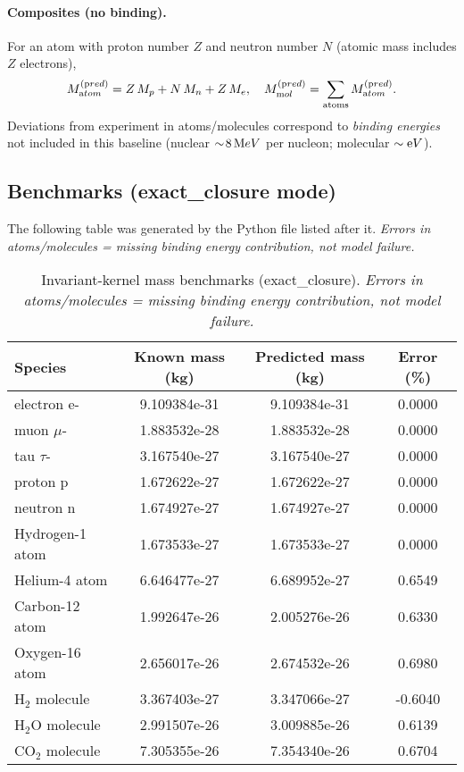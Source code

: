 \documentclass[11pt]{article}
\begin{document}
\paragraph{Composites (no binding).}
    For an atom with proton number $Z$ and neutron number $N$ (atomic mass includes $Z$ electrons),
    \[
        M_{\textrm atom}^{(\textrm pred)} = Z\,M_p+N\,M_n+Z\,M_e,\quad
        M_{\textrm mol}^{(\textrm pred)}=\sum_{\text{atoms}}M_{\textrm atom}^{(\textrm pred)}.
    \]
    Deviations from experiment in atoms/molecules correspond to \emph{binding energies} not included in this baseline (nuclear $\sim\!8\,{\textrm MeV}$ per nucleon; molecular $\sim{\textrm eV}$).

\subsection{Benchmarks (exact\_closure mode)}
\label{sec:benchmarks-exact-closure}
The following table was generated by the Python file listed after it.
\emph{Errors in atoms/molecules = missing binding energy contribution, not model failure.}

\begin{table}[H]
    \centering
    \caption{Invariant-kernel mass benchmarks (exact\_closure). \emph{Errors in atoms/molecules = missing binding energy contribution, not model failure.}}
    \begin{tabular}{lccc}
        \toprule
        Species & Known mass (kg) & Predicted mass (kg) & Error (\%)\\
        \midrule
        electron e- & 9.109384e-31 & 9.109384e-31 & 0.0000\\
        muon $\mu$- & 1.883532e-28 & 1.883532e-28 & 0.0000\\
        tau $\tau$- & 3.167540e-27 & 3.167540e-27 & 0.0000\\
        proton p & 1.672622e-27 & 1.672622e-27 & 0.0000\\
        neutron n & 1.674927e-27 & 1.674927e-27 & 0.0000\\
        Hydrogen-1 atom & 1.673533e-27 & 1.673533e-27 & 0.0000\\
        Helium-4 atom & 6.646477e-27 & 6.689952e-27 & 0.6549\\
        Carbon-12 atom & 1.992647e-26 & 2.005276e-26 & 0.6330\\
        Oxygen-16 atom & 2.656017e-26 & 2.674532e-26 & 0.6980\\
        H$_2$ molecule & 3.367403e-27 & 3.347066e-27 & -0.6040\\
        H$_2$O molecule & 2.991507e-26 & 3.009885e-26 & 0.6139\\
        CO$_2$ molecule & 7.305355e-26 & 7.354340e-26 & 0.6704\\
        \bottomrule
    \end{tabular}\label{tab:benchmarks-exact-closure}
\end{table}
\end{document}
